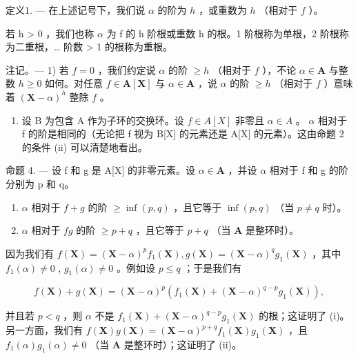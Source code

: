 定义1. --- 在上述记号下，我们说 \(\alpha\) 的阶为 \(h\) ，或重数为 \(h\) （相对于 \(f\) ）。

若 h \textgreater{} 0 ，我们也称 \(\alpha\) 为 f 的 h 阶根或重数 h 的根。1 阶根称为单根，2 阶根称为二重根，\ldots{} 阶数 \textgreater{} 1 的根称为重根。

注记。--- 1) 若 \(f=0\) ，我们约定说 \(\alpha\) 的阶 \(\geqslant h\) （相对于 \(f\) ），不论 \(\alpha\in\mathbf{A}\) 与整数 \(h\geqslant0\) 如何。对任意 \(f\in\mathbf{A}[\mathbf{X}]\) 与 \(\alpha\in\mathbf{A}\) ，说 \(\alpha\) 的阶 \(\geqslant h\) （相对于 \(f\) ）意味着 \((\mathbf{X}-\alpha)^{h}\) 整除 \(f\) 。

\begin{enumerate}
\def\labelenumi{\arabic{enumi})}
\setcounter{enumi}{1}
\tightlist
\item
  设 B 为包含 A 作为子环的交换环。设 \(f \in A[X]\) 非零且 \(\alpha \in A\) 。 \(\alpha\) 相对于 f 的阶是相同的（无论把 f 视为 B{[}X{]} 的元素还是 A{[}X{]} 的元素）。这由命题 2 的条件 (ii) 可以清楚地看出。
\end{enumerate}

命题 4. --- 设 f 和 g 是 A{[}X{]} 的非零元素。设 \(\alpha \in \mathbf{A}\) ，并设 \(\alpha\) 相对于 f 和 g 的阶分别为 p 和 q。

\begin{enumerate}
\def\labelenumi{(\roman{enumi})}
\item
  \(\alpha\) 相对于 \(f + g\) 的阶 \(\geqslant \inf(p, q)\) ，且它等于 \(\inf(p, q)\) （当 \(p \neq q\) 时）。
\item
  \(\alpha\) 相对于 \(fg\) 的阶 \(\geqslant p + q\) ，且它等于 \(p + q\) （当 \(\mathbf{A}\) 是整环时）。
\end{enumerate}

因为我们有 \(f(\mathbf{X}) = (\mathbf{X} - \alpha)^p f_1(\mathbf{X}), g(\mathbf{X}) = (\mathbf{X} - \alpha)^q g_1(\mathbf{X})\) ，其中 \(f_1(\alpha) \neq 0\) , \(g_1(\alpha) \neq 0\) 。例如设 \(p \leqslant q\) ；于是我们有

\[
f (\mathbf {X}) + g (\mathbf {X}) = (\mathbf {X} - \alpha) ^ {p} \left(f _ {1} (\mathbf {X}) + (\mathbf {X} - \alpha) ^ {q - p} g _ {1} (\mathbf {X})\right),
\]

并且若 \(p < q\) ，则 \(\alpha\) 不是 \(f_1(\mathbf{X}) + (\mathbf{X} - \alpha)^{q - p} g_1(\mathbf{X})\) 的根；这证明了 (i)。另一方面，我们有 \(f(\mathbf{X})g(\mathbf{X}) = (\mathbf{X} - \alpha)^{p + q} f_1(\mathbf{X})g_1(\mathbf{X})\) ，且 \(f_1(\alpha)g_1(\alpha) \neq 0\) （当 \(\mathbf{A}\) 是整环时）；这证明了 (ii)。

